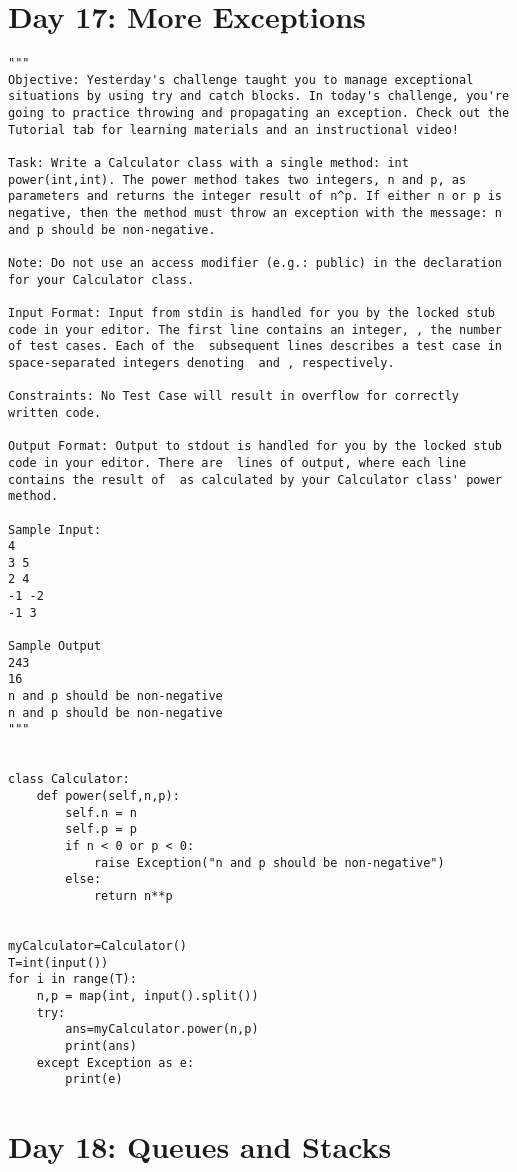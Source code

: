 \documentclass[11pt,a4paper]{article}
\begin{document}
\section{Day 17: More Exceptions}
\begin{lstlisting}
"""
Objective: Yesterday's challenge taught you to manage exceptional situations by using try and catch blocks. In today's challenge, you're going to practice throwing and propagating an exception. Check out the Tutorial tab for learning materials and an instructional video!

Task: Write a Calculator class with a single method: int power(int,int). The power method takes two integers, n and p, as parameters and returns the integer result of n^p. If either n or p is negative, then the method must throw an exception with the message: n and p should be non-negative.

Note: Do not use an access modifier (e.g.: public) in the declaration for your Calculator class.

Input Format: Input from stdin is handled for you by the locked stub code in your editor. The first line contains an integer, , the number of test cases. Each of the  subsequent lines describes a test case in  space-separated integers denoting  and , respectively.

Constraints: No Test Case will result in overflow for correctly written code.

Output Format: Output to stdout is handled for you by the locked stub code in your editor. There are  lines of output, where each line contains the result of  as calculated by your Calculator class' power method.

Sample Input:
4
3 5
2 4
-1 -2
-1 3

Sample Output
243
16
n and p should be non-negative
n and p should be non-negative
"""


class Calculator:
    def power(self,n,p):
        self.n = n
        self.p = p
        if n < 0 or p < 0:
            raise Exception("n and p should be non-negative")
        else:
            return n**p


myCalculator=Calculator()
T=int(input())
for i in range(T):
    n,p = map(int, input().split())
    try:
        ans=myCalculator.power(n,p)
        print(ans)
    except Exception as e:
        print(e) 
\end{lstlisting}


\newpage
\section{Day 18: Queues and Stacks}
\begin{lstlisting}


\end{lstlisting}
\end{document}
